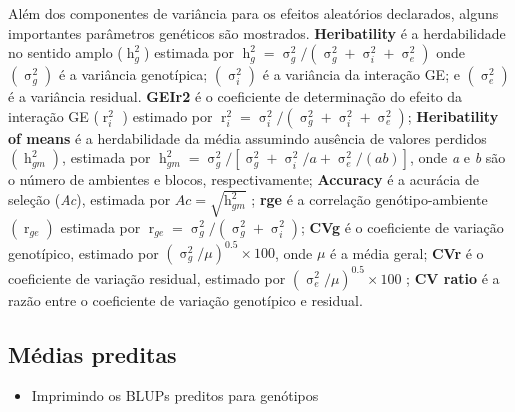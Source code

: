 \documentclass[
]{book}
\providecommand{\tightlist}{%
  \setlength{\itemsep}{0pt}\setlength{\parskip}{0pt}}
\begin{document}
Além dos componentes de variância  para os efeitos aleatórios declarados, alguns importantes parâmetros genéticos  são mostrados. \textbf{Heribatility} é a herdabilidade no sentido amplo (\(\mathop h\nolimits_g^2\)) estimada por \(\mathop h\nolimits_g^2 = \mathop \sigma \nolimits_g^2 /\left( {\mathop \sigma \nolimits_g^2 + \mathop \sigma \nolimits_i^2 + \mathop \sigma \nolimits_e^2 } \right)\) onde \((\mathop \sigma \nolimits_g^2 )\) é a variância genotípica; \((\mathop \sigma \nolimits_i^2 )\) é a variância da interação GE; e \((\mathop \sigma \nolimits_e^2 )\) é a variância residual. \textbf{GEIr2} é o coeficiente de determinação do efeito da interação GE (\(\mathop r\nolimits_i^2\) ) estimado por \(\mathop r\nolimits_i^2 = \mathop \sigma \nolimits_i^2 /\left( {\mathop \sigma \nolimits_g^2 + \mathop \sigma \nolimits_i^2 + \mathop \sigma \nolimits_e^2 } \right)\); \textbf{Heribatility of means} é a herdabilidade da média assumindo ausência de valores perdidos \((\mathop h\nolimits_{gm}^2 )\), estimada por \(\mathop h\nolimits_{gm}^2 = \mathop \sigma \nolimits_g^2 /\left[ {\mathop \sigma \nolimits_g^2 + \mathop \sigma \nolimits_i^2 /a + \mathop \sigma \nolimits_e^2 /\left( {ab} \right)} \right]\), onde \emph{a} e \emph{b} são o número de ambientes e blocos, respectivamente; \textbf{Accuracy} é a acurácia de seleção (\emph{Ac}), estimada por \(Ac = \sqrt{\mathop h\nolimits_{gm}^2}\) ; \textbf{rge} é a correlação genótipo-ambiente \((\mathop r\nolimits_{ge})\) estimada por \(\mathop r\nolimits_{ge} = \mathop \sigma \nolimits_g^2 /\left({\mathop \sigma \nolimits_g^2 + \mathop \sigma \nolimits_i^2} \right)\); \textbf{CVg} é o coeficiente de variação genotípico, estimado por \({\left({\mathop \sigma \nolimits_g^2 /\mu } \right)^{0.5}} \times 100\), onde \(\mu\) é a média geral; \textbf{CVr} é o coeficiente de variação residual, estimado por \({\left( {\mathop \sigma \nolimits_e^2 /\mu} \right)^{0.5}} \times 100\) ; \textbf{CV ratio} é a razão entre o coeficiente de variação genotípico e residual.

\hypertarget{muxe9dias-preditas}{%
\subsection{Médias preditas}\label{muxe9dias-preditas}}

\begin{itemize}
\tightlist
\item
  Imprimindo os BLUPs preditos para genótipos
\end{itemize}
\end{document}
